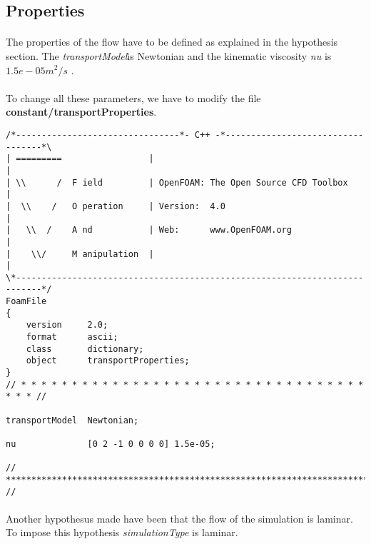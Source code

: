 \subsection{Properties}
\paragraph{}
The properties of the flow have to be defined as explained in the hypothesis section. The \textit{transportModel}is Newtonian and the  kinematic viscosity \textit{nu} is $1.5e-05 m^2/s$ .

\paragraph{}
To change all these parameters, we have to modify the file \textbf{constant/transportProperties}.


\begin{footnotesize}
\begin{verbatim}
/*--------------------------------*- C++ -*----------------------------------*\
| =========                 |                                                 |
| \\      /  F ield         | OpenFOAM: The Open Source CFD Toolbox           |
|  \\    /   O peration     | Version:  4.0                                   |
|   \\  /    A nd           | Web:      www.OpenFOAM.org                      |
|    \\/     M anipulation  |                                                 |
\*---------------------------------------------------------------------------*/
FoamFile
{
    version     2.0;
    format      ascii;
    class       dictionary;
    object      transportProperties;
}
// * * * * * * * * * * * * * * * * * * * * * * * * * * * * * * * * * * * * * //

transportModel  Newtonian;

nu              [0 2 -1 0 0 0 0] 1.5e-05;

// ************************************************************************* //
\end{verbatim}
\end{footnotesize}

\paragraph{}
Another hypothesus made have been that the flow of the simulation is laminar. To impose this hypothesis \textit{simulationType} is laminar.


